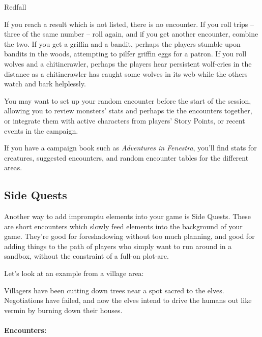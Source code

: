 \begin{multicols}{2}
\begin{encounters}{Redfall}
\end{encounters}

If you reach a result which is not listed, there is no encounter.
If you roll trips -- three of the same number -- roll again, and if you get another encounter, combine the two.
If you get a griffin and a bandit, perhaps the players stumble upon bandits in the woods, attempting to pilfer griffin eggs for a patron.
If you roll wolves and a chitincrawler, perhaps the players hear persistent wolf-cries in the distance as a chitincrawler has caught some wolves in its web while the others watch and bark helplessly.

You may want to set up your random encounter before the start of the session, allowing you to review monsters' stats and perhaps tie the encounters together, or integrate them with active characters from players' Story Points, or recent events in the campaign.

If you have a campaign book such as \textit{Adventures in Fenestra}, you'll find stats for creatures, suggested encounters, and random encounter tables for the different areas.

\subsection{Side Quests}\label{sidequests}

Another way to add impromptu elements into your game is Side Quests.
These are short encounters which slowly feed elements into the background of your game.
They're good for foreshadowing without too much planning, and good for adding things to the path of players who simply want to run around in a sandbox, without the constraint of a full-on plot-arc.

Let's look at an example from a village area:

\begin{exampletext}

	Villagers have been cutting down trees near a spot sacred to the elves.
	Negotiations have failed, and now the elves intend to drive the humans out like vermin by burning down their houses.

\end{exampletext}

\paragraph{Encounters:}

\begin{list}{\Square}{}


\end{list}
\end{multicols}
